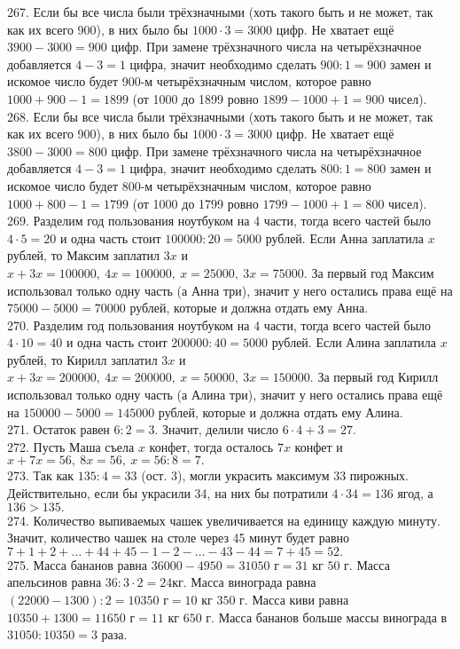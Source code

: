 267. Если бы все числа были трёхзначными (хоть такого быть и не может, так как их всего 900), в них было бы $1000\cdot3=3000$ цифр. Не хватает ещё $3900-3000=900$ цифр. При замене трёхзначного числа на четырёхзначное добавляется $4-3=1$ цифра, значит необходимо сделать $900:1=900$ замен и искомое число будет 900-м четырёхзначным числом, которое равно $1000+900-1=1899$ (от 1000 до 1899 ровно $1899-1000+1=900$ чисел).\\
268. Если бы все числа были трёхзначными (хоть такого быть и не может, так как их всего 900), в них было бы $1000\cdot3=3000$ цифр. Не хватает ещё $3800-3000=800$ цифр. При замене трёхзначного числа на четырёхзначное добавляется $4-3=1$ цифра, значит необходимо сделать $800:1=800$ замен и искомое число будет 800-м четырёхзначным числом, которое равно $1000+800-1=1799$ (от 1000 до 1799 ровно $1799-1000+1=800$ чисел).\\
269. Разделим год пользования ноутбуком на 4 части, тогда всего частей было $4\cdot5=20$ и одна часть стоит $100000:20=5000$ рублей. Если Анна заплатила $x$ рублей, то Максим заплатил $3x$ и $x+3x=100000,\ 4x=100000,\ x=25000,\ 3x=75000.$ За первый год Максим использовал только одну часть (а Анна три), значит у него остались права ещё на $75000-5000=70000$ рублей, которые и должна отдать ему Анна.\\
270. Разделим год пользования ноутбуком на 4 части, тогда всего частей было $4\cdot10=40$ и одна часть стоит $200000:40=5000$ рублей. Если Алина заплатила $x$ рублей, то Кирилл заплатил $3x$ и $x+3x=200000,\ 4x=200000,\ x=50000,\ 3x=150000.$ За первый год Кирилл использовал только одну часть (а Алина три), значит у него остались права ещё на $150000-5000=145000$ рублей, которые и должна отдать ему Алина.\\
271. Остаток равен $6:2=3.$ Значит, делили число $6\cdot4+3=27.$\\
272. Пусть Маша съела $x$ конфет, тогда осталось  $7x$ конфет и $x+7x=56,\ 8x=56,\ x=56:8=7.$\\
273. Так как $135:4=33$ (ост. 3), могли украсить максимум 33 пирожных. Действительно, если бы украсили 34, на них бы потратили $4\cdot34=136$ ягод, а $136>135.$\\
274. Количество выпиваемых чашек увеличивается на единицу каждую минуту. Значит, количество чашек на столе через 45 минут будет равно $7+1+2+\ldots+44+45-1-2-\ldots-43-44=7+45=52.$\\
275. Масса бананов равна $36000-4950=31050\text{ г}=31\text{ кг }50\text{ г}.$ Масса апельсинов равна $36:3\cdot2=24$кг. Масса винограда равна $(22000-1300):2=10350\text{ г}=10\text{ кг }350\text{ г}.$ Масса киви равна $10350+1300=11650\text{ г}=11\text{ кг }650\text{ г}.$ Масса бананов больше массы винограда в $31050:10350=3$ раза.\\
